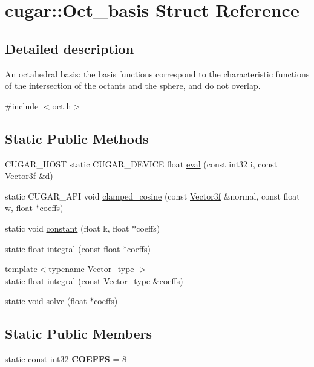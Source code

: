 \hypertarget{structcugar_1_1_oct__basis}{}\section{cugar\+:\+:Oct\+\_\+basis Struct Reference}
\label{structcugar_1_1_oct__basis}


\subsection{Detailed description}
An octahedral basis\+: the basis functions correspond to the characteristic functions of the intersection of the octants and the sphere, and do not overlap. 

{\ttfamily \#include $<$oct.\+h$>$}

\subsection*{Static Public Methods}
\begin{DoxyCompactItemize}
\item 
C\+U\+G\+A\+R\+\_\+\+H\+O\+ST static C\+U\+G\+A\+R\+\_\+\+D\+E\+V\+I\+CE float \hyperlink{structcugar_1_1_oct__basis_ab022f5b4779951eb1b8c40fae43dc97e}{eval} (const int32 i, const \hyperlink{structcugar_1_1_vector}{Vector3f} \&d)
\item 
static C\+U\+G\+A\+R\+\_\+\+A\+PI void \hyperlink{structcugar_1_1_oct__basis_adc3b730ed753c42c5c72bc772197fefc}{clamped\+\_\+cosine} (const \hyperlink{structcugar_1_1_vector}{Vector3f} \&normal, const float w, float $\ast$coeffs)
\item 
static void \hyperlink{structcugar_1_1_oct__basis_a4f0d03cb4cdbf7f32e54e9f9c1e4c608}{constant} (float k, float $\ast$coeffs)
\item 
static float \hyperlink{structcugar_1_1_oct__basis_acdc78f23aeaa874638b5acca1ee7c20b}{integral} (const float $\ast$coeffs)
\item 
{\footnotesize template$<$typename Vector\+\_\+type $>$ }\\static float \hyperlink{structcugar_1_1_oct__basis_ab86709e46d5c4fd8f3f6d0a5ef7eac7c}{integral} (const Vector\+\_\+type \&coeffs)
\item 
static void \hyperlink{structcugar_1_1_oct__basis_aa7178c4ee1c614fa880fdcbaea87f9e7}{solve} (float $\ast$coeffs)
\end{DoxyCompactItemize}
\subsection*{Static Public Members}
\begin{DoxyCompactItemize}
\item 
\mbox{\label{structcugar_1_1_oct__basis_a0f1ad56b864ed1ceeca41244c5392ce2}} 
static const int32 {\bfseries C\+O\+E\+F\+FS} = 8
\end{DoxyCompactItemize}



